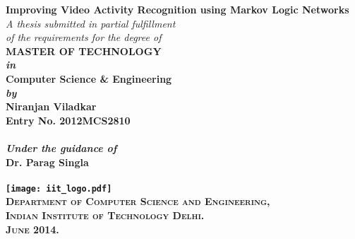 \begin{titlepage}
\begin{center}

\LARGE{\bfseries Improving Video Activity Recognition using Markov Logic Networks}\\
\vspace{20pt}
\normalsize
\emph{A thesis submitted in partial fulfillment} \\
\emph{of the requirements for the degree of} \\
\vspace{20pt}
\bfseries MASTER OF TECHNOLOGY \\
\vspace{20pt}
\emph {in}\\
\vspace{20pt}
\bfseries Computer Science \& Engineering \\
\vspace{20pt}
\emph {by}\\
\vspace{20pt}
\Large{\bfseries Niranjan Viladkar} \\
{\normalsize {\bfseries Entry No. 2012MCS2810}}\\
\ \\
{\normalsize \emph {Under the guidance of}}
\ \\
\Large{\bfseries Dr. Parag Singla} \\
\ \\
\vspace{30pt}
\texttt{[image: iit\_logo.pdf]} \\
\vspace{10pt}
\large{\textsc{Department of Computer Science and Engineering,\\
Indian Institute of Technology Delhi.\\ June 2014.}}
\end{center}
\end{titlepage}
